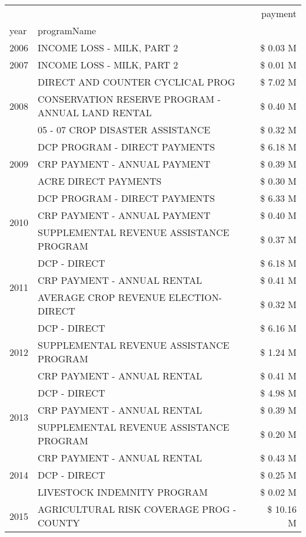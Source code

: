 \begin{tabular}{llr}
\toprule
 &  & payment \\
year & programName &  \\
\midrule
2006 & INCOME LOSS - MILK, PART 2 & \$ 0.03 M \\
\cline{1-3}
2007 & INCOME LOSS - MILK, PART 2 & \$ 0.01 M \\
\cline{1-3}
\multirow[t]{3}{*}{2008} & DIRECT AND COUNTER CYCLICAL PROG & \$ 7.02 M \\
 & CONSERVATION RESERVE PROGRAM - ANNUAL LAND RENTAL & \$ 0.40 M \\
 & 05 - 07 CROP DISASTER ASSISTANCE & \$ 0.32 M \\
\cline{1-3}
\multirow[t]{3}{*}{2009} & DCP PROGRAM - DIRECT PAYMENTS & \$ 6.18 M \\
 & CRP PAYMENT - ANNUAL PAYMENT & \$ 0.39 M \\
 & ACRE DIRECT PAYMENTS & \$ 0.30 M \\
\cline{1-3}
\multirow[t]{3}{*}{2010} & DCP PROGRAM - DIRECT PAYMENTS & \$ 6.33 M \\
 & CRP PAYMENT - ANNUAL PAYMENT & \$ 0.40 M \\
 & SUPPLEMENTAL REVENUE ASSISTANCE PROGRAM & \$ 0.37 M \\
\cline{1-3}
\multirow[t]{3}{*}{2011} & DCP - DIRECT & \$ 6.18 M \\
 & CRP PAYMENT - ANNUAL RENTAL & \$ 0.41 M \\
 & AVERAGE CROP REVENUE ELECTION-DIRECT & \$ 0.32 M \\
\cline{1-3}
\multirow[t]{3}{*}{2012} & DCP - DIRECT & \$ 6.16 M \\
 & SUPPLEMENTAL REVENUE ASSISTANCE PROGRAM & \$ 1.24 M \\
 & CRP PAYMENT - ANNUAL RENTAL & \$ 0.41 M \\
\cline{1-3}
\multirow[t]{3}{*}{2013} & DCP - DIRECT & \$ 4.98 M \\
 & CRP PAYMENT - ANNUAL RENTAL & \$ 0.39 M \\
 & SUPPLEMENTAL REVENUE ASSISTANCE PROGRAM & \$ 0.20 M \\
\cline{1-3}
\multirow[t]{3}{*}{2014} & CRP PAYMENT - ANNUAL RENTAL & \$ 0.43 M \\
 & DCP - DIRECT & \$ 0.25 M \\
 & LIVESTOCK INDEMNITY PROGRAM & \$ 0.02 M \\
\cline{1-3}
\multirow[t]{3}{*}{2015} & AGRICULTURAL RISK COVERAGE PROG - COUNTY & \$ 10.16 M \\

\end{tabular}
